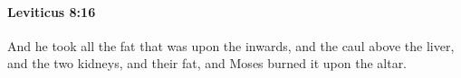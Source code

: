 
		\paragraph{Leviticus 8:16} %
			\label{LEVITICUS-8-16}

			And he took all the fat that was upon the inwards, and the caul above the liver, and the two kidneys, and their fat, and Moses burned it upon the altar.


